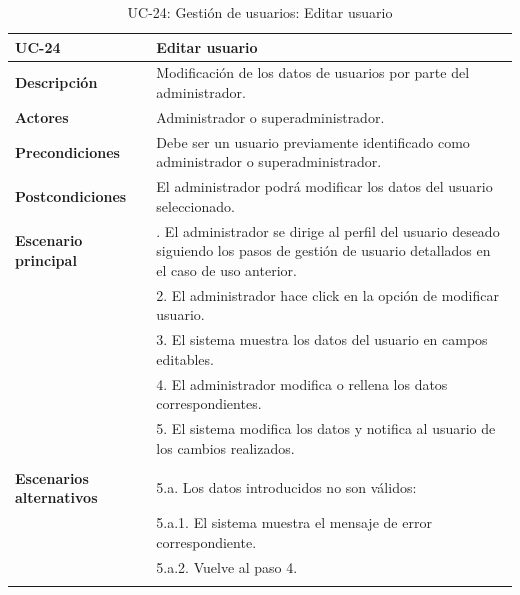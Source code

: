 \begin{table}[H]
  \begin{center}
    \begin{tabularx}{16.4cm}{|l|X|}
      \hline
      \textbf{UC-24} & \textbf{Editar usuario}\\
      \hline
      \textbf{Descripción} & Modificación de los datos de usuarios por parte del administrador.\\
      \hline
      \textbf{Actores} & Administrador o superadministrador.\\
      \hline
      \textbf{Precondiciones} & Debe ser un usuario previamente identificado como administrador o superadministrador.\\
      \hline
      \textbf{Postcondiciones} & El administrador podrá modificar los datos del usuario seleccionado.\\
      \hline
      \textbf{Escenario principal} & \smallskip 1. El administrador se dirige al perfil del usuario deseado siguiendo los pasos de gestión de usuario detallados en el caso de uso anterior.\\
      & 2. El administrador hace click en la opción de modificar usuario. \\
      & 3. El sistema muestra los datos del usuario en campos editables.\\
      & 4. El administrador modifica o rellena los datos correspondientes.\\
      & 5. El sistema modifica los datos y notifica al usuario de los cambios realizados.\\ 
      & \\
      \hline
      \textbf{Escenarios alternativos} & \smallskip 5.a. Los datos introducidos no son válidos:\\
      & \hspace{0.3cm} 5.a.1. El sistema muestra el mensaje de error correspondiente.\\
      & \hspace{0.3cm} 5.a.2. Vuelve al paso 4.\\
      & \\
      \hline
    \end{tabularx}
    \caption{UC-24: Gestión de usuarios: Editar usuario}
    \label{tab:CU-editar-usuario}
  \end{center}
\end{table}



